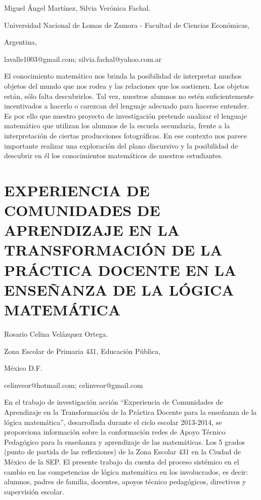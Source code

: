 \begin{datos}

Miguel Ángel Martínez, Silvia Verónica Fachal.

Universidad Nacional de Lomas de Zamora - Facultad de Ciencias Económicas,

Argentina,

lavalle1003@gmail.com; silvia.fachal@yahoo.com.ar

\end{datos}

El conocimiento matemático nos brinda la posibilidad de interpretar
muchos objetos del mundo que nos rodea y las relaciones que los sostienen.
Los objetos están, sólo falta descubrirlos. Tal vez, nuestros alumnos
no estén suficientemente incentivados a hacerlo o carezcan del lenguaje
adecuado para hacerse entender. Es por ello que nuestro proyecto de
investigación pretende analizar el lenguaje matemático que utilizan
los alumnos de la escuela secundaria, frente a la interpretación de
ciertas producciones fotográficas. En ese contexto nos parece importante
realizar una exploración del plano discursivo y la posibilidad de
descubrir en él los conocimientos matemáticos de nuestros estudiantes.


\section{EXPERIENCIA DE COMUNIDADES DE APRENDIZAJE EN LA TRANSFORMACIÓN DE
LA PRÁCTICA DOCENTE EN LA ENSEÑANZA DE LA LÓGICA MATEMÁTICA }

\begin{datos}

Rosario Celina Velázquez Ortega.

Zona Escolar de Primaria 431, Educación Pública,

México D.F.

celinveor@hotmail.com; celinveor@gmail.com

\end{datos}

En el trabajo de investigación acción “Experiencia de Comunidades
de Aprendizaje en la Transformación de la Práctica Docente para la
enseñanza de la lógica matemática”, desarrollada durante el ciclo
escolar 2013-2014, se proporciona información sobre la conformación
redes de Apoyo Técnico Pedagógico para la enseñanza y aprendizaje
de las matemáticas. Los 5\textdegree{} grados (punto de partida de
las reflexiones) de la Zona Escolar 431 en la Ciudad de México de
la SEP. El presente trabajo da cuenta del proceso sistémico en el
cambio en las competencias de lógica matemática en los involucrados,
es decir: alumnos, padres de familia, docentes, apoyos técnico pedagógicos,
directivos y supervisión escolar.



